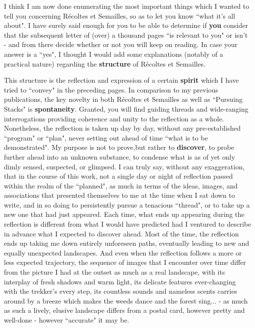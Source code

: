 I think I am now done enumerating the most important things which I wanted to tell you concerning R\'ecoltes et Semailles, so as to let you know ``what it's all about". I have surely said enough for you to be able to determine if \textbf{you} consider that the subsequent letter of (over) a thousand pages ``is relevant to you" or isn't - and from there decide whether or not you will keep on reading. In case your answer is a ``yes", I thought I would add some explanations (notably of a practical nature) regarding the \textbf{structure} of R\'ecoltes et Semailles.

This structure is the reflection and expression of a certain \textbf{spirit} which I have tried to ``convey" in the preceding pages. In comparison to my previous publications, the key novelty in both R\'ecoltes et Semailles as well as ``Pursuing Stacks" is \textbf{spontaneity}. Granted, you will find guiding threads and wide-ranging interrogations providing coherence and unity to the reflection as a whole. Nonetheless, the reflection is taken up day by day, without any pre-established ``program" or ``plan", never setting out ahead of time ``what is to be demonstrated". My purpose is not to prove,but rather to \textbf{discover}, to probe further ahead into an unknown substance, to condense what is as of yet only dimly sensed, suspected, or glimpsed. I can truly say, without any exaggeration, that in the course of this work, not a single day or night of reflection passed within the realm of the ``planned", as much in terms of the ideas, images, and associations that presented themselves to me at the time when I sat down to write, and in so doing to persistently pursue a tenacious ``thread", or to take up a new one that had just appeared. Each time, what ends up appearing during the reflection is different from what I would have predicted had I ventured to describe in advance what I expected to discover ahead. Most of the time, the reflection ends up taking me down entirely unforeseen paths, eventually leading to new and equally unexpected landscapes. And even when the reflection follows a more or less expected trajectory, the sequence of images that I encounter over time differ from the picture I had at the outset as much as a real landscape, with its interplay of fresh shadows and warm light, its delicate features ever-changing with the trekker's every step, its countless sounds and nameless scents carries around by a breeze which makes the weeds dance and the forest sing... - as much as such a lively, elusive landscape differs from a postal card, however pretty and well-done - however ``accurate" it may be.

